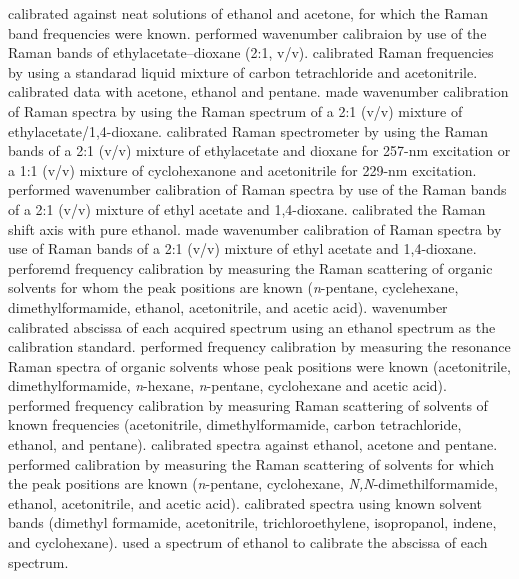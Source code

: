 \textcite{Suen1999} calibrated against neat solutions of ethanol and acetone,
for which the Raman band frequencies were known. \textcite{Toyama1999}
performed wavenumber calibraion by use of the Raman bands of
ethylacetate--dioxane (2:1, v/v). \textcite{Wen1999} calibrated Raman
frequencies by using a standarad liquid mixture of carbon tetrachloride and
acetonitrile. \textcite{Sokolov2000} calibrated data with acetone, ethanol and
pentane. \textcite{Toyama2001} made wavenumber calibration of Raman spectra
by using the Raman spectrum of a 2:1 (v/v) mixture of ethylacetate/1,4-dioxane.
\textcite{Fujimoto2002} calibrated Raman spectrometer by using the Raman bands
of a 2:1 (v/v) mixture of ethylacetate and dioxane for 257-nm excitation or a
1:1 (v/v) mixture of cyclohexanone and acetonitrile for 229-nm excitation.
\textcite{Toyama2002} performed wavenumber calibration of Raman spectra by use
of the Raman bands of a 2:1 (v/v) mixture of ethyl acetate and 1,4-dioxane.
\textcite{Nelson2004} calibrated the Raman shift axis with pure ethanol.
\textcite{Toyama2005,Toyama2005a} made wavenumber calibration of Raman spectra
by use of Raman bands of a 2:1 (v/v) mixture of ethyl acetate and 1,4-dioxane.
\textcite{Billinghurst2006,Billinghurst2006a} perforemd frequency calibration
by measuring the Raman scattering of organic solvents for whom the peak
positions are known (\textit{n}-pentane, cyclehexane, dimethylformamide,
ethanol, acetonitrile, and acetic acid). \textcite{Jirasek2006} wavenumber
calibrated abscissa of each acquired spectrum using an ethanol spectrum as the
calibration standard. \textcite{Kundu2007} performed frequency calibration by
measuring the resonance Raman spectra of organic solvents whose peak positions
were known (acetonitrile, dimethylformamide, \textit{n}-hexane,
\textit{n}-pentane, cyclohexane and acetic acid). \textcite{Yarasi2007}
performed frequency calibration by measuring Raman scattering of solvents of
known frequencies (acetonitrile, dimethylformamide, carbon tetrachloride,
ethanol, and pentane). \textcite{Knee2008} calibrated spectra against ethanol,
acetone and pentane. \textcite{Billinghurst2009} performed calibration by
measuring the Raman scattering of solvents for which the peak positions are
known (\textit{n}-pentane, cyclohexane, \textit{N,N}-dimethilformamide,
ethanol, acetonitrile, and acetic acid). \textcite{Jayanth2009} calibrated
spectra using known solvent bands (dimethyl formamide, acetonitrile,
trichloroethylene, isopropanol, indene, and cyclohexane). \textcite{Shaw2009}
used a spectrum of ethanol to calibrate the abscissa of each spectrum.
